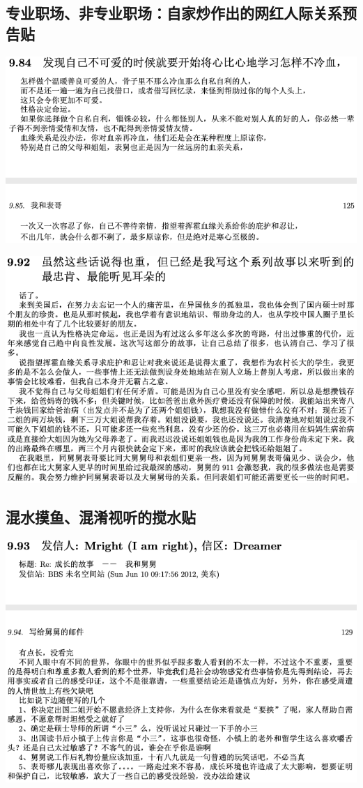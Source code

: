 \documentclass[9pt, b5paper]{article}
\begin{document}
\subsection{专业职场、非专业职场：自家炒作出的网红人际关系预告贴}
\label{sec:orgb1cc8f5}

\begin{center}
\includegraphics[width=.9\linewidth]{./pic/p1p125.png}
\end{center}

\begin{center}
\includegraphics[width=.9\linewidth]{./pic/p1p128-3.png}
\end{center}

\subsection{混水摸鱼、混淆视听的搅水贴}
\label{sec:org2df2058}

\begin{center}
\includegraphics[width=.9\linewidth]{./pic/p1p129-2.png}
\end{center}
\end{document}
